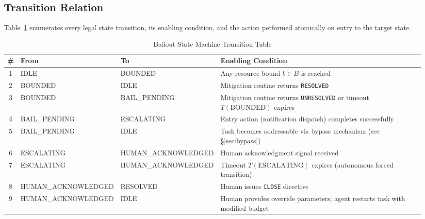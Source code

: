 
\subsection{Transition Relation}

Table~\ref{tab:transitions} enumerates every legal state transition,
its enabling condition, and the action performed atomically on entry to
the target state.

\begin{table}[htbp]
  \centering
  \caption{Bailout State Machine Transition Table}
  \label{tab:transitions}
  \begin{tabular}{@{}clll@{}}
    \toprule
    \textbf{\#} &
    \textbf{From} &
    \textbf{To} &
    \textbf{Enabling Condition} \\
    \midrule
    1 & IDLE       & BOUNDED       & Any resource bound $b \in B$ is reached                \\[4pt]
    2 & BOUNDED    & IDLE          & Mitigation routine returns \texttt{RESOLVED}           \\[4pt]
    3 & BOUNDED    & BAIL\_PENDING & Mitigation routine returns \texttt{UNRESOLVED} or
                                          timeout $T(\text{BOUNDED})$ expires \\[4pt]
    4 & BAIL\_PENDING & ESCALATING  & Entry action (notification dispatch) completes
                                          successfully                                               \\[4pt]
    5 & BAIL\_PENDING & IDLE        & Task becomes addressable via bypass mechanism
                                          (see \S\ref{sec:bypass})                                   \\[4pt]
    6 & ESCALATING & HUMAN\_ACKNOWLEDGED & Human acknowledgment signal received    \\[4pt]
    7 & ESCALATING & HUMAN\_ACKNOWLEDGED & Timeout $T(\text{ESCALATING})$ expires
                                          (autonomous forced transition)                             \\[4pt]
    8 & HUMAN\_ACKNOWLEDGED & RESOLVED & Human issues \texttt{CLOSE} directive         \\[4pt]
    9 & HUMAN\_ACKNOWLEDGED & IDLE    & Human provides override parameters; agent
                                          restarts task with modified budget                          \\[4pt]
    \bottomrule
  \end{tabular}
\end{table}

